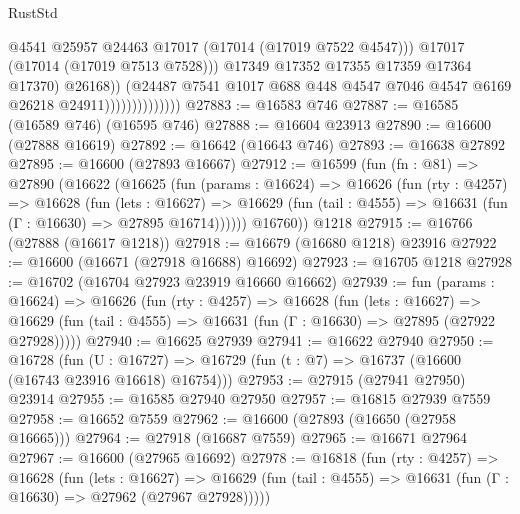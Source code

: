 \begin{lexlean}{RustStd}
\begin{coremodule}
{\begin{coremodule}
{{{{{{{{{{{{{{{{{{{{{{{{{{{{{{{{{{{{{{{{{{{{{{{{{{{{{{{                                        @4541
                                        @25957
                                        @24463
                                        @17017
                                        (@17014 (@17019 @7522 @4547)))
                                      @17017
                                      (@17014 (@17019 @7513 @7528)))
                                    @17349
                                    @17352
                                    @17355
                                    @17359
                                    @17364
                                    @17370)
                                  @26168))
                              (@24487
                                @7541
                                @1017
                                @688
                                @448
                                @4547
                                @7046
                                @4547
                                @6169
                                @26218
                                @24911))))))))))))))
@27883 := @16583 @746
@27887 := @16585 (@16589 @746) (@16595 @746)
@27888 := @16604 @23913
@27890 := @16600 (@27888 @16619)
@27892 := @16642 (@16643 @746)
@27893 := @16638 @27892
@27895 := @16600 (@27893 @16667)
@27912 := @16599
    (fun (fn : @81) =>
    @27890
      (@16622
        (@16625
          (fun (params : @16624) =>
          @16626
            (fun (rty : @4257) =>
            @16628
              (fun (lets : @16627) =>
              @16629 (fun (tail : @4555) => @16631 (fun (Γ : @16630) => @27895 @16714))))))
        @16760))
    @1218
@27915 := @16766 (@27888 (@16617 @1218))
@27918 := @16679 (@16680 @1218) @23916
@27922 := @16600 (@16671 (@27918 @16688) @16692)
@27923 := @16705 @1218
@27928 := @16702 (@16704 @27923 @23919 @16660 @16662)
@27939 := fun (params : @16624) =>
  @16626
    (fun (rty : @4257) =>
    @16628
      (fun (lets : @16627) =>
      @16629 (fun (tail : @4555) => @16631 (fun (Γ : @16630) => @27895 (@27922 @27928)))))
@27940 := @16625 @27939
@27941 := @16622 @27940
@27950 := @16728
    (fun (U : @16727) => @16729 (fun (t : @7) => @16737 (@16600 (@16743 @23916 @16618) @16754)))
@27953 := @27915 (@27941 @27950) @23914
@27955 := @16585 @27940 @27950
@27957 := @16815 @27939 @7559
@27958 := @16652 @7559
@27962 := @16600 (@27893 (@16650 (@27958 @16665)))
@27964 := @27918 (@16687 @7559)
@27965 := @16671 @27964
@27967 := @16600 (@27965 @16692)
@27978 := @16818
    (fun (rty : @4257) =>
    @16628
      (fun (lets : @16627) =>
      @16629 (fun (tail : @4555) => @16631 (fun (Γ : @16630) => @27962 (@27967 @27928)))))
}}}}}}}}}}}}}}}}}}}}}}}}}}}}}}}}}}}}}}}}}}}}}}}}}}}}}}}
\end{coremodule}}
\end{coremodule}
\end{lexlean}
